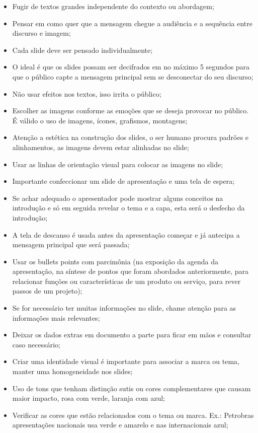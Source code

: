 \begin{itemize}
    \item Fugir de textos grandes independente do contexto ou abordagem;
    \item Pensar em como quer que a mensagem chegue a audiência e a sequência entre discurso e imagem;
    \item Cada slide deve ser pensado individualmente;
    \item O ideal é que os slides possam ser decifrados em no máximo 5 segundos para que o público capte a mensagem principal sem se desconectar do seu discurso;
    \item Não usar efeitos nos textos, isso irrita o público;
    \item Escolher as imagens conforme as emoções que se deseja provocar no público. É válido o uso de imagens, ícones, grafismos, montagens;
    \item Atenção a estética na construção dos slides, o ser humano procura padrões e alinhamentos, as imagens devem estar alinhadas no slide;
    \item Usar as linhas de orientação visual para colocar as imagens no slide;
    \item Importante confeccionar um slide de apresentação e uma tela de espera;
    \item Se achar adequado o apresentador pode mostrar alguns conceitos na introdução e só em seguida revelar o tema e a capa, esta será o desfecho da introdução;
    \item A tela de descanso é usada antes da apresentação começar e já antecipa a mensagem principal que será passada;
    \item Usar os bullets points com parcimônia (na exposição da agenda da apresentação, na síntese de pontos que foram abordados anteriormente, para relacionar funções ou características de um produto ou serviço, para rever passos de um projeto);
    \item Se for necessário ter muitas informações no slide, chame atenção para as informações mais relevantes;
    \item Deixar os dados extras em documento a parte para ficar em mãos e consultar caso necessário;
    \item Criar uma identidade visual é importante para associar a marca ou tema, manter uma homogeneidade nos slides;
    \item Uso de tons que tenham distinção sutis ou cores complementares que causam maior impacto, rosa com verde, laranja com azul;
    \item Verificar as cores que estão relacionados com o tema ou marca. Ex.: Petrobras apresentações nacionais usa verde e amarelo e nas internacionais azul;

\end{itemize}
